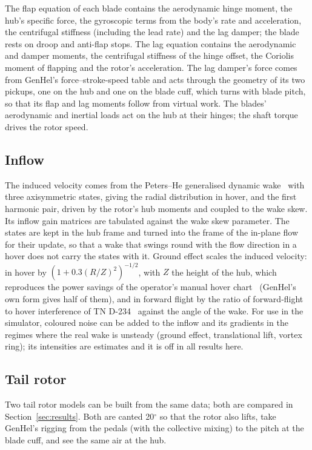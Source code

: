 \documentclass[10pt,a4paper,twocolumn]{article}
\begin{document}
The flap equation of each blade contains the aerodynamic hinge moment, the hub's specific force, the gyroscopic terms
from the body's rate and acceleration, the centrifugal stiffness (including the lead rate) and the lag damper; the blade rests
on droop and anti-flap stops. The lag equation contains the aerodynamic and damper moments, the centrifugal stiffness of the
hinge offset, the Coriolis moment of flapping and the rotor's acceleration. The lag damper's force comes from GenHel's
force--stroke-speed table and acts through the geometry of its two pickups, one on the hub and one on the blade cuff, which
turns with blade pitch, so that its flap and lag moments follow from virtual work. The blades' aerodynamic and inertial loads act on the hub at their hinges; the
shaft torque drives the rotor speed.

\subsection{Inflow}
The induced velocity comes from the Peters--He generalised dynamic wake~\cite{metu} with three axisymmetric states, giving the
radial distribution in hover, and the first harmonic pair, driven by the rotor's hub moments and coupled to the wake skew. Its
inflow gain matrices are tabulated against the wake skew parameter. The states are kept in the hub frame and turned into the
frame of the in-plane flow for their update, so that a wake that swings round with the flow direction in a hover does not
carry the states with it. Ground effect scales the induced velocity: in hover by $(1+0.3(R/Z)^2)^{-1/2}$, with $Z$ the height
of the hub, which reproduces the power savings of the operator's manual hover chart~\cite{tm} (GenHel's own form gives half of them), and in
forward flight by the ratio of forward-flight to hover interference of TN D-234~\cite{heyson} against the angle of the wake.
For use in the simulator, coloured noise can be added to the inflow and its gradients in the regimes where the real wake is
unsteady (ground effect, translational lift, vortex ring); its intensities are estimates and it is off in all results here.

\subsection{Tail rotor}
Two tail rotor models can be built from the same data; both are compared in Section~\ref{sec:results}. Both are canted
20$^\circ$ so that the rotor also lifts, take GenHel's rigging from the pedals (with the collective mixing) to the pitch at the
blade cuff, and see the same air at the hub.
\end{document}
